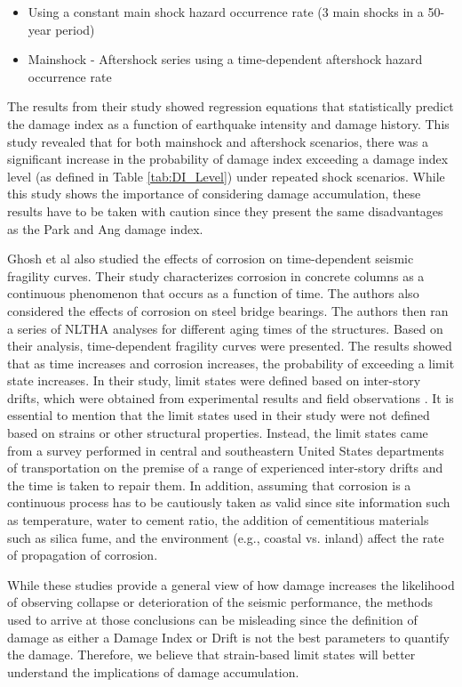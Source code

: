 \begin{itemize}
	\item Using a constant main shock hazard occurrence rate (3 main shocks in a 50-year period)
	\item Mainshock - Aftershock series using a time-dependent aftershock hazard occurrence rate
\end{itemize}

The results from their study showed regression equations that statistically predict the damage index as a function of earthquake intensity and damage history. This study revealed that for both mainshock and aftershock scenarios, there was a significant increase in the probability of damage index exceeding a damage index level (as defined in Table \ref{tab:DI_Level}) under repeated shock scenarios. While this study shows the importance of considering damage accumulation, these results have to be taken with caution since they present the same disadvantages as the Park and Ang damage index.

Ghosh et al \cite{Ghosh2010} also studied the effects of corrosion on time-dependent seismic fragility curves. Their study characterizes corrosion in concrete columns as a continuous phenomenon that occurs as a function of time. The authors also considered the effects of corrosion on steel bridge bearings. The authors then ran a series of NLTHA analyses for different aging times of the structures. Based on their analysis, time-dependent fragility curves were presented. The results showed that as time increases and corrosion increases, the probability of exceeding a limit state increases. In their study, limit states were defined based on inter-story drifts, which were obtained from experimental results and field observations \cite{Padgett2007}. It is essential to mention that the limit states used in their study were not defined based on strains or other structural properties. Instead, the limit states came from a survey performed in central and southeastern United States departments of transportation on the premise of a range of experienced inter-story drifts and the time is taken to repair them. In addition, assuming that corrosion is a continuous process has to be cautiously taken as valid since site information such as temperature, water to cement ratio, the addition of cementitious materials such as silica fume, and the environment (e.g., coastal vs. inland) affect the rate of propagation of corrosion\cite{Thoft-Christensen}.

While these studies provide a general view of how damage increases the likelihood of observing collapse or deterioration of the seismic performance, the methods used to arrive at those conclusions can be misleading since the definition of damage as either a Damage Index or Drift is not the best parameters to quantify the damage. Therefore, we believe that strain-based limit states will better understand the implications of damage accumulation.

